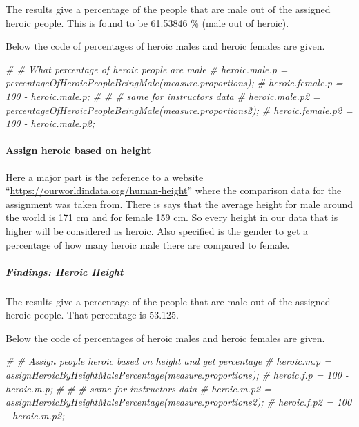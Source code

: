 \documentclass[]{article}
\newenvironment{Shaded}{\begin{snugshade}}{\end{snugshade}}
\newcommand{\CommentTok}[1]{\textcolor[rgb]{0.56,0.35,0.01}{\textit{#1}}}
\begin{document}
The results give a percentage of the people that are male out of the
assigned heroic people. This is found to be 61.53846 \% (male out of
heroic).

Below the code of percentages of heroic males and heroic females are
given.

\begin{Shaded}
\begin{Highlighting}[]
\CommentTok{\# \# What percentage of heroic people are male}
\CommentTok{\# heroic.male.p = percentageOfHeroicPeopleBeingMale(measure.proportions);}
\CommentTok{\# heroic.female.p = 100 {-} heroic.male.p;}
\CommentTok{\# }
\CommentTok{\# \# same for instructors data}
\CommentTok{\# heroic.male.p2 = percentageOfHeroicPeopleBeingMale(measure.proportions2);}
\CommentTok{\# heroic.female.p2 = 100 {-} heroic.male.p2;}
\end{Highlighting}
\end{Shaded}

\newpage

\paragraph{Assign heroic based on height}
\label{sec:appendix-heroic-height}

Here a major part is the reference to a website
``\url{https://ourworldindata.org/human-height}'' where the comparison
data for the assignment was taken from. There is says that the average
height for male around the world is 171 cm and for female 159 cm. So
every height in our data that is higher will be considered as heroic.
Also specified is the gender to get a percentage of how many heroic male
there are compared to female.

\subparagraph{Findings: Heroic Height}
\label{sec:appendix-findings-heroic-height}

The results give a percentage of the people that are male out of the
assigned heroic people. That percentage is 53.125.

Below the code of percentages of heroic males and heroic females are
given.

\begin{Shaded}
\begin{Highlighting}[]
\CommentTok{\# \# Assign people heroic based on height and get percentage}
\CommentTok{\# heroic.m.p = assignHeroicByHeightMalePercentage(measure.proportions);}
\CommentTok{\# heroic.f.p = 100 {-} heroic.m.p;}
\CommentTok{\# }
\CommentTok{\# \# same for instructors data}
\CommentTok{\# heroic.m.p2 = assignHeroicByHeightMalePercentage(measure.proportions2);}
\CommentTok{\# heroic.f.p2 = 100 {-} heroic.m.p2;}
\end{Highlighting}
\end{Shaded}
\end{document}
